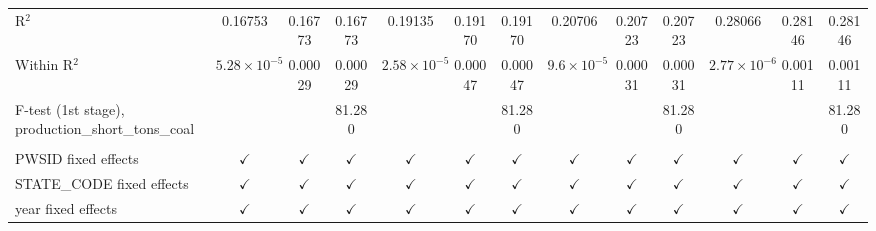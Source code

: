 \begin{table}[htbp]
\begin{adjustbox}{width = \textwidth, center}
\begin{tabular}{lcccccccccccc}
         R$^2$                                                & 0.16753                & 0.16773       & 0.16773               & 0.19135               & 0.19170        & 0.19170               & 0.20706               & 0.20723       & 0.20723               & 0.28066                & 0.28146       & 0.28146\\  
         Within R$^2$                                         & $5.28\times 10^{-5}$   & 0.00029       & 0.00029               & $2.58\times 10^{-5}$  & 0.00047        & 0.00047               & $9.6\times 10^{-5}$   & 0.00031       & 0.00031               & $2.77\times 10^{-6}$   & 0.00111       & 0.00111\\  
         F-test (1st stage), production\_short\_tons\_coal    &                        &               & 81.280                &                       &                & 81.280                &                       &               & 81.280                &                        &               & 81.280\\  
          \\
         PWSID fixed effects                                  & $\checkmark$           & $\checkmark$  & $\checkmark$          & $\checkmark$          & $\checkmark$   & $\checkmark$          & $\checkmark$          & $\checkmark$  & $\checkmark$          & $\checkmark$           & $\checkmark$  & $\checkmark$\\   
         STATE\_CODE fixed effects                            & $\checkmark$           & $\checkmark$  & $\checkmark$          & $\checkmark$          & $\checkmark$   & $\checkmark$          & $\checkmark$          & $\checkmark$  & $\checkmark$          & $\checkmark$           & $\checkmark$  & $\checkmark$\\   
         year fixed effects                                   & $\checkmark$           & $\checkmark$  & $\checkmark$          & $\checkmark$          & $\checkmark$   & $\checkmark$          & $\checkmark$          & $\checkmark$  & $\checkmark$          & $\checkmark$           & $\checkmark$  & $\checkmark$\\   
         \bottomrule
      \end{tabular}
   \end{adjustbox}
\end{table}



